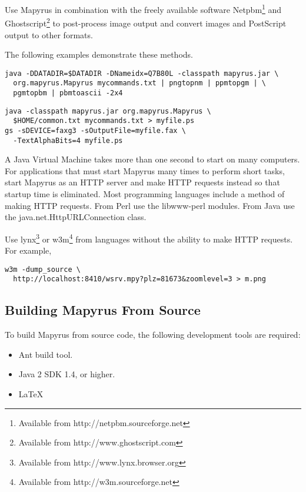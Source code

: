 Use Mapyrus in combination with the freely available software
Netpbm\footnote{Available from http://netpbm.sourceforge.net} and
Ghostscript\footnote{Available from http://www.ghostscript.com} to post-process
image output and convert images and PostScript output to other formats.

The following examples demonstrate these methods.

\begin{verbatim}
java -DDATADIR=$DATADIR -DNameidx=Q7B80L -classpath mapyrus.jar \
  org.mapyrus.Mapyrus mycommands.txt | pngtopnm | ppmtopgm | \
  pgmtopbm | pbmtoascii -2x4
\end{verbatim}

\begin{verbatim}
java -classpath mapyrus.jar org.mapyrus.Mapyrus \
  $HOME/common.txt mycommands.txt > myfile.ps
gs -sDEVICE=faxg3 -sOutputFile=myfile.fax \
  -TextAlphaBits=4 myfile.ps
\end{verbatim}

A Java Virtual Machine takes more than one second to start on many computers.
For applications that must start Mapyrus many times to perform short tasks,
start Mapyrus as an HTTP server and make HTTP requests instead so that
startup time is eliminated.
Most programming languages include a method of making HTTP requests.
From Perl use the libwww-perl modules.
From Java use the java.net.HttpURLConnection class.

Use lynx\footnote{Available from http://www.lynx.browser.org} or
w3m\footnote{Available from http://w3m.sourceforge.net}
from languages without the ability to make
HTTP requests.  For example,

\begin{verbatim}
w3m -dump_source \
  http://localhost:8410/wsrv.mpy?plz=81673&zoomlevel=3 > m.png
\end{verbatim}

\subsection{Building Mapyrus From Source}

To build Mapyrus from source code, the following development tools
are required:

\begin{itemize}
\item
Ant build tool.
\item
Java 2 SDK 1.4, or higher.
\item
\LaTeX
\end{itemize}

